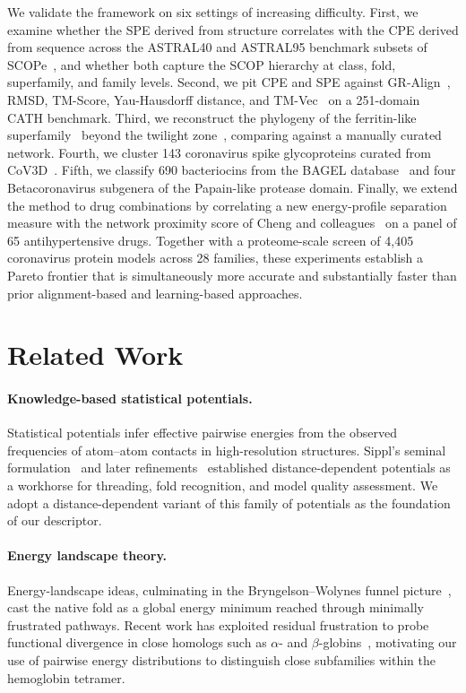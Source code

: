 \documentclass[11pt]{article}
\begin{document}
We validate the framework on six settings of increasing difficulty. First, we
examine whether the SPE derived from structure correlates with the CPE derived
from sequence across the ASTRAL40 and ASTRAL95 benchmark subsets of
SCOPe~\citep{chandonia2019scope}, and whether both capture the SCOP hierarchy
at class, fold, superfamily, and family levels. Second, we pit CPE and SPE
against GR-Align~\citep{maloddognin2014gralign}, RMSD, TM-Score, Yau-Hausdorff
distance, and TM-Vec~\citep{hamamsy2024tmvec} on a 251-domain CATH benchmark.
Third, we reconstruct the phylogeny of the ferritin-like
superfamily~\citep{lundin2012ferritin} beyond the twilight
zone~\citep{chothia1986twilight}, comparing against a manually curated network.
Fourth, we cluster 143 coronavirus spike glycoproteins curated from
CoV3D~\citep{gowthaman2021cov3d}. Fifth, we classify 690 bacteriocins from the
BAGEL database~\citep{alkhalili2018bagel} and four Betacoronavirus subgenera of
the Papain-like protease domain. Finally, we extend the method to drug
combinations by correlating a new energy-profile separation measure with the
network proximity score of Cheng and colleagues~\citep{zhou2020network} on a
panel of 65 antihypertensive drugs. Together with a proteome-scale screen of
4{,}405 coronavirus protein models across 28 families, these experiments
establish a Pareto frontier that is simultaneously more accurate and
substantially faster than prior alignment-based and learning-based approaches.

\section{Related Work}

\paragraph{Knowledge-based statistical potentials.}
Statistical potentials infer effective pairwise energies from the observed
frequencies of atom--atom contacts in high-resolution structures. Sippl's
seminal formulation~\citep{sippl1990potential} and later
refinements~\citep{koppensteiner1998knowledge} established distance-dependent
potentials as a workhorse for threading, fold recognition, and model quality
assessment. We adopt a distance-dependent variant of this family of potentials
as the foundation of our descriptor.

\paragraph{Energy landscape theory.}
Energy-landscape ideas, culminating in the
Bryngelson--Wolynes funnel picture~\citep{bryngelson1995wolynes}, cast the
native fold as a global energy minimum reached through minimally frustrated
pathways. Recent work has exploited residual frustration to probe functional
divergence in close homologs such as $\alpha$- and
$\beta$-globins~\citep{freiberger2023frustration}, motivating our use of
pairwise energy distributions to distinguish close subfamilies within the
hemoglobin tetramer.
\end{document}
